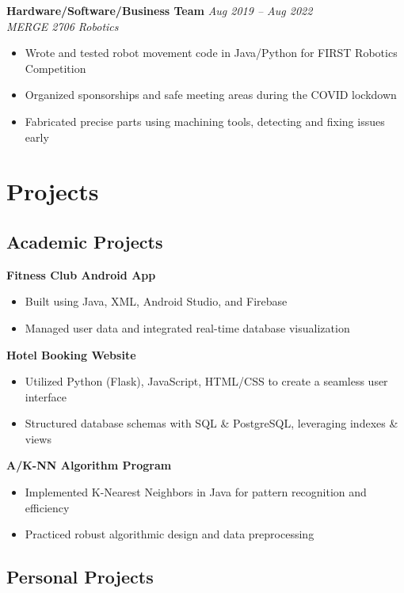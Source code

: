 \documentclass[11pt]{article}
\begin{document}
\textbf{Hardware/Software/Business Team} \hfill \textit{Aug 2019 -- Aug 2022} \\
\textit{MERGE 2706 Robotics}
\begin{itemize}
    \item Wrote and tested robot movement code in Java/Python for FIRST Robotics Competition
    \item Organized sponsorships and safe meeting areas during the COVID lockdown
    \item Fabricated precise parts using machining tools, detecting and fixing issues early
\end{itemize}

\section*{Projects}

\subsection*{Academic Projects}

\textbf{Fitness Club Android App}
\begin{itemize}
    \item Built using Java, XML, Android Studio, and Firebase
    \item Managed user data and integrated real-time database visualization
\end{itemize}

\textbf{Hotel Booking Website}
\begin{itemize}
    \item Utilized Python (Flask), JavaScript, HTML/CSS to create a seamless user interface
    \item Structured database schemas with SQL \& PostgreSQL, leveraging indexes \& views
\end{itemize}

\textbf{A/K-NN Algorithm Program}
\begin{itemize}
    \item Implemented K-Nearest Neighbors in Java for pattern recognition and efficiency
    \item Practiced robust algorithmic design and data preprocessing
\end{itemize}

\subsection*{Personal Projects}
\end{document}
